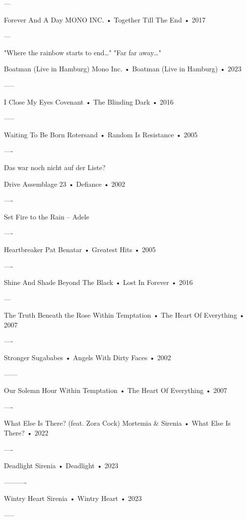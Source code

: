 —

Forever And A Day
MONO INC.
 •
Together Till The End
 •
2017


—

"Where the rainbow starts to end…"
"Far far away…"

Boatman (Live in Hamburg)
Mono Inc.
 •
Boatman (Live in Hamburg)
 •
2023

—--

I Close My Eyes
Covenant
 •
The Blinding Dark
 •
2016


—--

Waiting To Be Born
Rotersand
 •
Random Is Resistance
 •
2005



—-

Das war noch nicht auf der Liste?

Drive
Assemblage 23
 •
Defiance
 •
2002


----


Set Fire to the Rain – Adele


----

Heartbreaker
Pat Benatar
 •
Greatest Hits
 • 2005

----


Shine And Shade
Beyond The Black
 •
Lost In Forever
 • 2016

 ---


The Truth Beneath the Rose
Within Temptation
 •
The Heart Of Everything
 • 2007

 ----



Stronger
Sugababes
 •
Angels With Dirty Faces
 • 2002




—---


Our Solemn Hour
Within Temptation
 •
The Heart Of Everything
 •
2007




—-




What Else Is There? (feat. Zora Cock)
Mortemia
 &
Sirenia
 •
What Else Is There?
 • 2022


—-




Deadlight
Sirenia
 •
Deadlight
 • 2023


—-------




Wintry Heart
Sirenia
 •
Wintry Heart
 • 2023




—--













